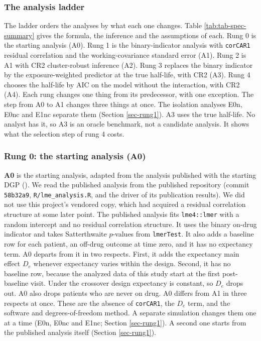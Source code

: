 \documentclass[
  11pt,
]{article}
\begin{document}
\subsubsection{The analysis ladder}\label{sec-ladder-def}

The ladder orders the analyses by what each one changes. Table
\ref{tab:tab-spec-summary} gives the formula, the inference and the
assumptions of each. Rung 0 is the starting analysis (A0). Rung 1 is
the binary-indicator analysis with \texttt{corCAR1} residual correlation and
the working-covariance standard error (A1). Rung 2 is A1 with CR2
cluster-robust inference (A2). Rung 3 replaces the binary indicator by
the exposure-weighted predictor at the true half-life, with CR2 (A3).
Rung 4 chooses the half-life by AIC on the model without the
interaction, with CR2 (A4). Each rung changes one thing from its
predecessor, with one exception. The step from A0 to A1 changes three
things at once. The isolation analyses E0n, E0nc and E1nc separate
them (Section \ref{sec-rung1}). A3 uses the true half-life. No
analyst has it, so A3 is an oracle benchmark, not a candidate
analysis. It shows what the selection step of rung 4 costs.

\subsubsection{Rung 0: the starting analysis (A0)}\label{sec-e0}

\textbf{A0} is the starting analysis, adapted from the analysis published
with the starting DGP (). We read the published
analysis from the published repository (commit \texttt{58b32a9},
\texttt{R/lme\_analysis.R}, and the driver of its publication results). We
did not use this project's vendored copy, which had acquired a
residual correlation structure at some later point. The published
analysis fits \texttt{lme4::lmer} with a random intercept and no residual
correlation structure. It uses the binary on-drug indicator and takes
Satterthwaite \(p\)-values from \texttt{lmerTest}. It also adds a baseline row
for each patient, an off-drug outcome at time zero, and it has no
expectancy term. A0 departs from it in two respects. First, it adds
the expectancy main effect \(D_e\) whenever expectancy varies within
the design. Second, it has no baseline row, because the analyzed data
of this study start at the first post-baseline visit. Under the crossover
design expectancy is constant, so \(D_e\) drops out. A0 also drops
patients who are never on drug. A0 differs from A1 in three respects
at once. These are the absence of \texttt{corCAR1}, the \(D_e\) term, and the
software and degrees-of-freedom method. A separate simulation changes
them one at a time (E0n, E0nc and E1nc; Section \ref{sec-rung1}). A
second one starts from the published analysis itself (Section
\ref{sec-rung1}).
\end{document}

